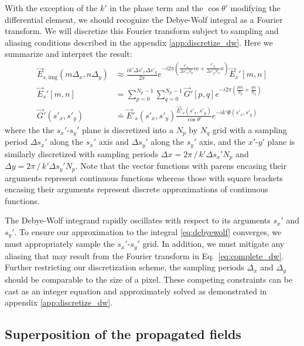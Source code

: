 With the exception of the $k'$ in the phase term and the $\cos{\theta'}$ 
modifying the differential element, we should recognize the
Debye-Wolf integral as a Fourier transform. We will discretize this
Fourier transform subject to sampling and aliasing conditions described
in the appendix \ref{app:discretize_dw}. Here we summarize and interpret the result:
\begin{equation}
  \begin{split}
    \vec{E}_{s,\text{img}}( m \Delta_x, n \Delta_y) & \approx \frac{i k' \Delta s'_x \Delta s'_y}{2 \pi} e^{-i2\pi \left ( \frac{s'_{x_o}}{\Delta s'_x N_p} m + \frac{s'_{y_o}}{\Delta s'_yN_q} n \right ) } \vec{E}_s'\left [ m, n \right ] \\
    \vec{E}_s'\left [ m,n \right ] & = \sum_{p=0}^{N_p-1}\sum_{q=0}^{N_p-1}\vec{G}'\left [p,q\right ] e^{-i2\pi \left ( \frac{pm}{N_p}+\frac{qn}{N_q} \right ) } \\
    \vec{G}'(s'_x,s'_y) & \doteq \vec{E}'_s(s'_x,s'_y)\frac{\vec{E}'_s(s'_x,s'_y)}{\cos{\theta'}}e^{-ik'\Phi(s'_x,s'_y)}
  \end{split}
  \label{eq:complete_dw}
\end{equation}
where the the $s_x'$-$s_y'$ plane is discretized into a
$N_p$ by $N_q$ grid with a sampling period $\Delta s_x'$ along the $s_x'$ axis and
$\Delta s_y'$ along the $s_y'$ axis, and the $x'$-$y'$ plane is similarly discretized with
sampling periods $\Delta x = 2\pi \, / \, k' \Delta s_x' N_p$ and $\Delta y = 2\pi \, / \, k' \Delta s_y' N_p$.
Note that the vector functions with parens encasing their arguments represent
continuous functions whereas those with square brackets encasing their arguments represent
discrete approximations of continuous functions.

The Debye-Wolf integrand rapidly oscillates with respect to its arguments $s_x'$ and $s_y'$.
To ensure our approximation to the integral \eqref{eq:debyewolf} converges, we
must appropriately sample the $s_x'$-$s_y'$ grid. In addition, we must mitigate any
aliasing that may result from the Fourier transform in Eq.~\eqref{eq:complete_dw}.
Further restricting our discretization scheme, the sampling periods $\Delta_x$
and $\Delta_y$ should be comparable to the size of a pixel. These competing constraints
can be cast as an integer equation and approximately solved as demonstrated
in appendix \ref{app:discretize_dw}.

\subsection{Superposition of the propagated fields}

